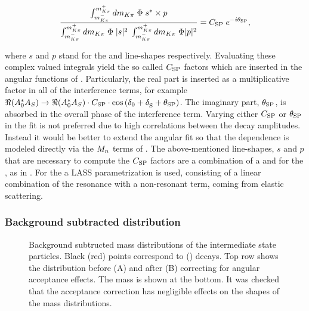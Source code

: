 \begin{equation}
  \centering
  \label{csp_def}
  \frac{\int_{\mkpi^-}^{\mkpi^+} d\mkpi \; \Phi \; s^* \times p} {\int_{\mkpi^-}^{\mkpi^+} d\mkpi \; \Phi \; |s|^2 \; \int_{\mkpi^-}^{\mkpi^+} d\mkpi \; \Phi |p|^2} = \CSP \; e^{-i\ThetaSP},
\end{equation}

\noindent where $s$ and $p$ stand for the \swave and \pwave line-shapes respectively. Evaluating these complex valued integrals yield
the so called $C_{\text{SP}}$ factors which are inserted in the angular functions of . Particularly, the real part
is inserted as a multiplicative factor in all of the \spwave interference terms, for example $\Re({A}_{0}^* {A}_{S}) \rightarrow \Re({A}_{0}^* {A}_{S}) \cdot C_{\text{SP}}\cdot\cos\left( \delta_{0}+\delta_{\text{S}}^{}+\theta_{\text{SP}} \right)$.
The imaginary part, $\theta_{\text{SP}}$, is absorbed in the overall phase of the \spwave interference term.
Varying either $C_{\text{SP}}$ or $\theta_{\text{SP}}$ in the fit is not preferred due to high correlations between the decay amplitudes.
Instead it would be better to extend the angular fit so that the \mkpi dependence is modeled directly via the $M_{n}$
terms of . The above-mentioned line-shapes, $s$ and $p$ that are necessary
to compute the $C_{\text{SP}}$ factors are a combination of a \KstENT and \KstOFOZ for the \pwave, as
in \cite{PhysRevD.11.3165}. For the \swave a LASS parametrization \cite{Aston1988493} is used,
consisting of a linear combination of the \KstOFTZ resonance with a non-resonant term, coming from elastic scattering.

\subsubsection{Background subtracted \mkpi distribution}

\begin{figure}[!t]
  \centering
  \begin{subfigure}{0.5\textwidth}
    \raggedright
    \scalebox{0.56}{}
    \caption{}
    \label{mkpiPlot_raw}
  \end{subfigure}%
  \hfill%
  \begin{subfigure}{0.5\textwidth}
    \raggedleft
    \scalebox{0.56}{}
    \caption{}
    \label{mkpiPlot_eff}
  \end{subfigure}
  \begin{subfigure}{0.5\textwidth}
    \raggedright
    \scalebox{0.56}{}
    \caption{}
    \label{jpsiPlot}
  \end{subfigure}
\caption{Background subtructed mass distributions of the intermediate state particles.
         Black (red) points correspond to \Bd (\Bs) decays. Top row shows the \mkpi distribution before (A)
         and after (B) correcting for angular acceptance effects. The \jpsi mass is shown at the bottom.
         It was checked that the acceptance correction has negligible effects on the shapes of the \jpsi mass distributions.}
\end{figure}

